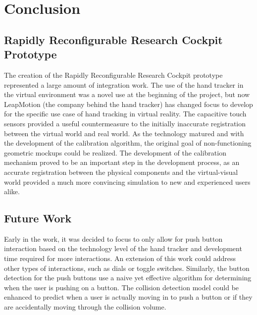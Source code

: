 \chapter{Conclusion}
\label{chap:conclusion}

\section{Rapidly Reconfigurable Research Cockpit Prototype}

The creation of the Rapidly Reconfigurable Research Cockpit prototype represented a large amount of integration work.
The use of the hand tracker in the virtual environment was a novel use at the beginning of the project, but now LeapMotion (the company behind the hand tracker) has changed focus to develop for the specific use case of hand tracking in virtual reality.
The capacitive touch sensors provided a useful countermeasure to the initially inaccurate registration between the virtual world and real world.
As the technology matured and with the development of the calibration algorithm, the original goal of non-functioning geometric mockups could be realized.
The development of the calibration mechanism proved to be an important step in the development process, as an accurate registration between the physical components and the virtual-visual world provided a much more convincing simulation to new and experienced users alike.

\section{Future Work}


Early in the work, it was decided to focus to only allow for push button interaction based on the technology level of the hand tracker and development time required for more interactions.
An extension of this work could address other types of interactions, such as dials or toggle switches.
Similarly, the button detection for the push buttons use a naive yet effective algorithm for determining when the user is pushing on a button.
The collision detection model could be enhanced to predict when a user is actually moving in to push a button or if they are accidentally moving through the collision volume.

